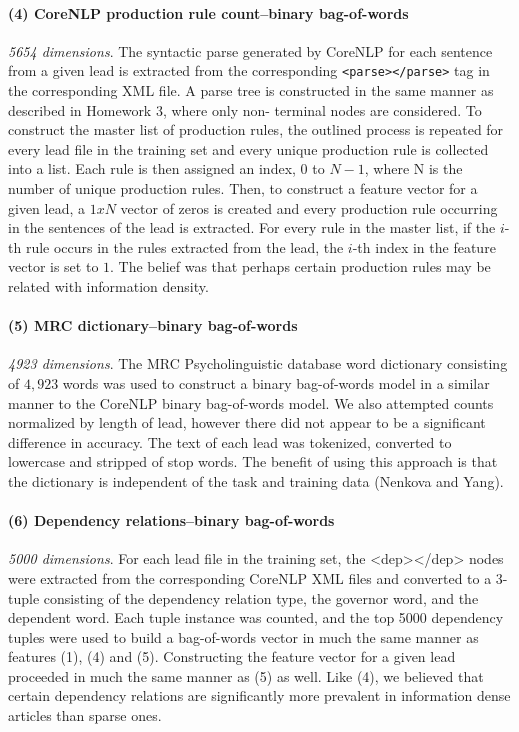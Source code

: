 \documentclass[
10pt, %
a4paper, %
oneside, %
headinclude,footinclude, %
BCOR5mm, %
]{scrartcl}
\begin{document}
\paragraph{\textbf{(4) CoreNLP production rule count--binary bag-of-words}}
\hfill \newline \noindent \textit{5654 dimensions}. The syntactic parse
generated by CoreNLP for each sentence from a given lead is extracted from the
corresponding \texttt{<parse></parse>} tag in the corresponding XML file. A
parse tree is constructed in the same manner as described in Homework 3, where
only non- terminal nodes are considered. To construct the master list of
production rules, the outlined process is repeated for every lead file in the
training set and every unique production rule is collected into a list.
Each rule is then assigned an index, $0$ to $N-1$, where N is the number of
unique production rules. Then, to construct a feature vector for a given lead, a
$1 x N$ vector of zeros is created and every production rule occurring in the
sentences of the lead is extracted. For every rule in the master list, if the
$i$-th rule occurs in the rules extracted from the lead, the $i$-th index in the
feature vector is set to $1$. The belief was that perhaps certain production
rules may be related with information density.

\paragraph{\textbf{(5) MRC dictionary--binary bag-of-words}}
\hfill \newline \noindent \textit{4923 dimensions}. 
The MRC Psycholinguistic database word dictionary consisting of $4,923$ words
was used to construct a binary bag-of-words model in a similar manner to the
CoreNLP binary bag-of-words model. We also attempted counts normalized by length
of lead, however there did not appear to be a significant difference in
accuracy. The text of each lead was tokenized, converted to lowercase and
stripped of stop words. The benefit of using this approach is that the
dictionary is independent of the task and training data (Nenkova and Yang).

\paragraph{\textbf{(6) Dependency relations--binary bag-of-words}}
\hfill \newline \noindent \textit{5000 dimensions}. 
For each lead file in the training set, the <dep></dep> nodes were extracted 
from the corresponding CoreNLP XML files and converted to a 3-tuple consisting 
of the dependency relation type, the governor word, and the dependent word. 
Each tuple instance was counted, and the top 5000 dependency tuples were used 
to build a bag-of-words vector in much the same manner as features (1), (4)
and (5). Constructing the feature vector for a given lead proceeded in much the
same manner as (5) as well. Like (4), we believed that certain dependency
relations are significantly more prevalent in information dense articles than
sparse ones.
\end{document}
